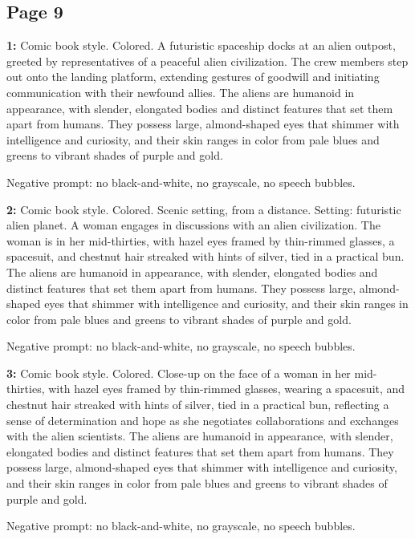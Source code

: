 \subsection*{Page 9}
\begin{iquote}
    \textbf{1:} Comic book style. Colored. A futuristic spaceship docks at an alien outpost, greeted by representatives of a peaceful alien civilization. The crew members step out onto the landing platform, extending gestures of goodwill and initiating communication with their newfound allies. The aliens are humanoid in appearance, with slender, elongated bodies and distinct features that set them apart from humans. They possess large, almond-shaped eyes that shimmer with intelligence and curiosity, and their skin ranges in color from pale blues and greens to vibrant shades of purple and gold.

    \noindent Negative prompt: no black-and-white, no grayscale, no speech bubbles.
\end{iquote}

\begin{iquote}
    \textbf{2:} Comic book style. Colored. Scenic setting, from a distance. Setting: futuristic alien planet. A woman engages in discussions with an alien civilization. The woman is in her mid-thirties, with hazel eyes framed by thin-rimmed glasses, a spacesuit, and chestnut hair streaked with hints of silver, tied in a practical bun. The aliens are humanoid in appearance, with slender, elongated bodies and distinct features that set them apart from humans. They possess large, almond-shaped eyes that shimmer with intelligence and curiosity, and their skin ranges in color from pale blues and greens to vibrant shades of purple and gold. 

    \noindent Negative prompt: no black-and-white, no grayscale, no speech bubbles.
\end{iquote}

\begin{iquote}
    \textbf{3:} Comic book style. Colored. Close-up on the face of a woman in her mid-thirties, with hazel eyes framed by thin-rimmed glasses, wearing a spacesuit, and chestnut hair streaked with hints of silver, tied in a practical bun, reflecting a sense of determination and hope as she negotiates collaborations and exchanges with the alien scientists. The aliens are humanoid in appearance, with slender, elongated bodies and distinct features that set them apart from humans. They possess large, almond-shaped eyes that shimmer with intelligence and curiosity, and their skin ranges in color from pale blues and greens to vibrant shades of purple and gold. 

    \noindent Negative prompt: no black-and-white, no grayscale, no speech bubbles.
\end{iquote}

